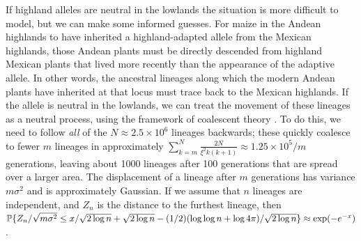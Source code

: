 If highland alleles are neutral in the lowlands the situation is more difficult to model, but we can make some informed guesses.
For maize in the Andean highlands to have inherited a highland-adapted allele from the Mexican highlands, those Andean plants must be directly descended from highland Mexican plants that lived more recently than the appearance of the adaptive allele.
In other words, the ancestral lineages along which the modern Andean plants have inherited at that locus must trace back to the Mexican highlands.
If the allele is neutral in the lowlands, we can treat the movement of these lineages as a neutral process, using the framework of coalescent theory \citep{wakeley2005coalescent}.
To do this, we need to follow \emph{all} of the $N \approx 2.5 \times 10^6$ lineages backwards; these quickly coalesce to fewer $m$ lineages in approximately $\sum_{k=m}^N \frac{2N}{\xi^2 k(k+1)} \approx 1.25 \times 10^5/m$ generations, leaving about 1000 lineages after 100 generations that are spread over a larger area.
The displacement of a lineage after $m$ generations has variance $m \sigma^2$ and is approximately Gaussian.
If we assume that $n$ lineages are independent, and $Z_n$ is the distance to the furthest lineage, then $\P\{ Z_n / \sqrt{m \sigma^2} \le x /\sqrt{2 \log n} + \sqrt{2 \log n} - (1/2) (\log \log n + \log 4 \pi)/\sqrt{2 \log n} \} \approx \exp( - e^{-x} )$ \citep{berman1964limit}. 






